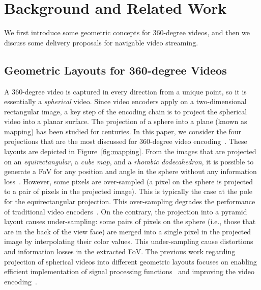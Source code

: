 \section{Background and Related Work}
\label{sec:related}

We first introduce some geometric concepts for 360-degree videos, and then we discuss
some delivery proposals for navigable video streaming.

\subsection{Geometric Layouts for 360-degree Videos}

A 360-degree video is captured in every direction from a unique
point, so it is essentially a \emph{spherical} video. Since video encoders apply on a
two-dimensional rectangular image, a key step of the encoding chain is to project the spherical
video into a planar
surface.
The projection of a sphere into a plane (known as mapping) has been studied
for centuries. In this paper, we consider the four projections that are the most discussed for
360-degree video encoding~\cite{yu_framework_2015}. These layouts are depicted in
Figure~\ref{fig:mapping}.
From
the images that are
projected on an \textit{equirectangular}, a \textit{cube map}, and a
\textit{rhombic dodecahedron}, it is possible
to generate a \ac{FoV}
for any position and angle in the sphere without any information
loss~\cite{Ng2005, fu_rhombic_2009}. However, some pixels
are over-sampled (a pixel on the sphere is projected to a pair of pixels in the
projected image). This is typically the case at the pole for the equirectangular projection.
This over-sampling degrades the
performance of traditional video encoders~\cite{wojciechowski_h.264_2006,
yu_framework_2015}.
On the
contrary, the projection into a pyramid layout causes under-sampling: some pairs of pixels
on the sphere (i.e., those that are
in the back of the view face) are merged into a single pixel in
the projected image by interpolating their
color values. This under-sampling cause distortions and information losses in the extracted
FoV.
The previous work regarding projection of spherical videos into different
geometric layouts focuses on enabling efficient implementation of signal processing
functions~\cite{kazhdan_metric-aware_2010} and improving the video
encoding~\cite{tosic_low_2009}.

